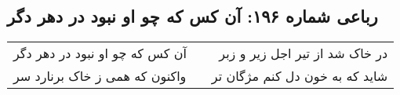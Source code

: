 \begin{center}
\section*{رباعی شماره ۱۹۶: آن کس که چو او نبود در دهر دگر}
\label{sec:sh196}
\begin{longtable}{l p{0.5cm} r}
آن کس که چو او نبود در دهر دگر
&&
در خاک شد از تیر اجل زیر و زبر
\\
واکنون که همی ز خاک برنارد سر
&&
شاید که به خون دل کنم مژگان تر
\\
\end{longtable}
\end{center}
